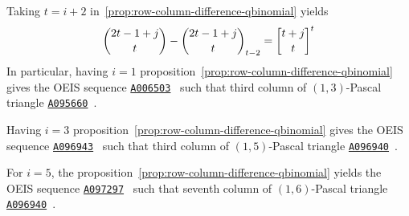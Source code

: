 Taking $t=i+2$ in~\eqref{prop:row-column-difference-qbinomial} yields
\begin{align*}
    \binom{2t-1+j}{t} - \rascalNumber{2t-1+j}{t}{t-2} = \oneQBinomial{t+j}{t}{t}
\end{align*}
In particular, having $i=1$ proposition~\eqref{prop:row-column-difference-qbinomial}
gives the OEIS sequence \href{https://oeis.org/A006503}{\texttt{A006503}}~\cite{sloane1995n}
such that third column of $(1,3)$-Pascal triangle
\href{https://oeis.org/A095660}{\texttt{A095660}}~\cite{sloane2004pascal13}.

Having $i=3$ proposition~\eqref{prop:row-column-difference-qbinomial}
gives the OEIS sequence \href{https://oeis.org/A096943}{\texttt{A096943}}~\cite{sloane2004sixth}
such that third column of $(1,5)$-Pascal triangle
\href{https://oeis.org/A096940}{\texttt{A096940}}~\cite{sloane2004pascal}.

For $i=5$, the proposition~\eqref{prop:row-column-difference-qbinomial} yields
the OEIS sequence \href{https://oeis.org/A097297}{\texttt{A097297}}~\cite{sloane2004seventh}
such that seventh column of $(1,6)$-Pascal triangle
\href{https://oeis.org/A096940}{\texttt{A096940}}~\cite{sloane2004pascal16}.
